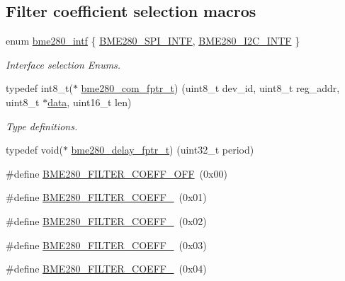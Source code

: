 \subsection*{Filter coefficient selection macros}
\begin{DoxyCompactItemize}
\item 
enum \hyperlink{group___b_m_e280_ga142fcd9cb1e99b793488e9b3b1e6766e}{bme280\+\_\+intf} \{ \hyperlink{group___b_m_e280_gga142fcd9cb1e99b793488e9b3b1e6766eab5516f6eca9b94ae116261c33c388f4c}{B\+M\+E280\+\_\+\+S\+P\+I\+\_\+\+I\+N\+TF}, 
\hyperlink{group___b_m_e280_gga142fcd9cb1e99b793488e9b3b1e6766eaae41ddfd32babefbce48e7b7671f46a2}{B\+M\+E280\+\_\+\+I2\+C\+\_\+\+I\+N\+TF}
 \}\begin{DoxyCompactList}\small\item\em Interface selection Enums. \end{DoxyCompactList}
\item 
typedef int8\+\_\+t($\ast$ \hyperlink{group___b_m_e280_ga7c23fe68ccf92adb3f03882b40739e7b}{bme280\+\_\+com\+\_\+fptr\+\_\+t}) (uint8\+\_\+t dev\+\_\+id, uint8\+\_\+t reg\+\_\+addr, uint8\+\_\+t $\ast$\hyperlink{structdata}{data}, uint16\+\_\+t len)
\begin{DoxyCompactList}\small\item\em Type definitions. \end{DoxyCompactList}\item 
typedef void($\ast$ \hyperlink{group___b_m_e280_gab2783d9a00e56ddc3e0e8d37b3462e34}{bme280\+\_\+delay\+\_\+fptr\+\_\+t}) (uint32\+\_\+t period)
\item 
\#define \hyperlink{group___b_m_e280_gae61c58ec304b87f6f9726992af323dc3}{B\+M\+E280\+\_\+\+F\+I\+L\+T\+E\+R\+\_\+\+C\+O\+E\+F\+F\+\_\+\+O\+FF}~(0x00)
\item 
\#define \hyperlink{group___b_m_e280_ga225fa757613310b9dfd1cb83cfe71080}{B\+M\+E280\+\_\+\+F\+I\+L\+T\+E\+R\+\_\+\+C\+O\+E\+F\+F\+\_}~(0x01)
\item 
\#define \hyperlink{group___b_m_e280_ga75df0ff360627c3efdd98ad38a92dab0}{B\+M\+E280\+\_\+\+F\+I\+L\+T\+E\+R\+\_\+\+C\+O\+E\+F\+F\+\_}~(0x02)
\item 
\#define \hyperlink{group___b_m_e280_gae6f638d18f380c7e537c02c7bb1a6c22}{B\+M\+E280\+\_\+\+F\+I\+L\+T\+E\+R\+\_\+\+C\+O\+E\+F\+F\+\_}~(0x03)
\item 
\#define \hyperlink{group___b_m_e280_ga73ced29de70a4fe0fa1f05676b2604e4}{B\+M\+E280\+\_\+\+F\+I\+L\+T\+E\+R\+\_\+\+C\+O\+E\+F\+F\+\_}~(0x04)
\end{DoxyCompactItemize}


